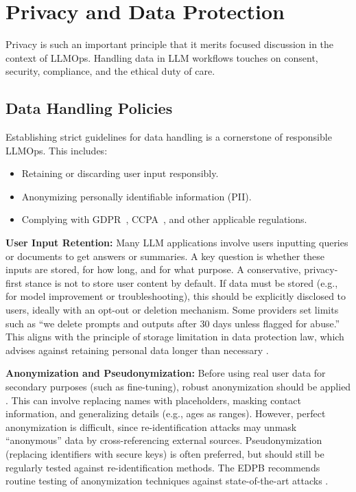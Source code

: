 \section{Privacy and Data Protection}\label{sec:ethics-privacy}

Privacy is such an important principle that it merits focused discussion in the context of LLMOps. Handling data in LLM workflows touches on consent, security, compliance, and the ethical duty of care.

\subsection{Data Handling Policies}

Establishing strict guidelines for data handling is a cornerstone of responsible LLMOps. This includes:
\begin{itemize}
    \item Retaining or discarding user input responsibly.
    \item Anonymizing personally identifiable information (PII).
    \item Complying with GDPR~\cite{gdpr2016}, CCPA~\cite{ccpa2018}, and other applicable regulations.
\end{itemize}

\textbf{User Input Retention:} Many LLM applications involve users inputting queries or documents to get answers or summaries. A key question is whether these inputs are stored, for how long, and for what purpose. A conservative, privacy-first stance is not to store user content by default. If data must be stored (e.g., for model improvement or troubleshooting), this should be explicitly disclosed to users, ideally with an opt-out or deletion mechanism. Some providers set limits such as ``we delete prompts and outputs after 30 days unless flagged for abuse.'' This aligns with the principle of storage limitation in data protection law, which advises against retaining personal data longer than necessary \cite{edpb2022}.

\textbf{Anonymization and Pseudonymization:} Before using real user data for secondary purposes (such as fine-tuning), robust anonymization should be applied \cite{edpb2022}. This can involve replacing names with placeholders, masking contact information, and generalizing details (e.g., ages as ranges). However, perfect anonymization is difficult, since re-identification attacks may unmask ``anonymous'' data by cross-referencing external sources. Pseudonymization (replacing identifiers with secure keys) is often preferred, but should still be regularly tested against re-identification methods. The EDPB recommends routine testing of anonymization techniques against state-of-the-art attacks \cite{edpb2022}.


